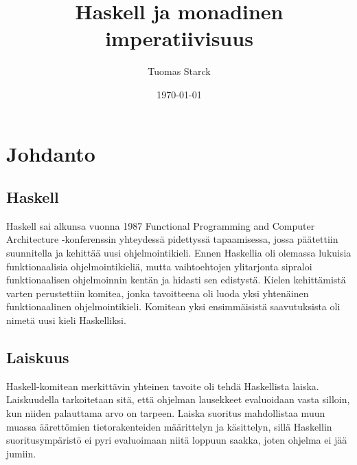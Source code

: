 \documentclass[finnish]{tktltiki2}
\title{Haskell ja monadinen imperatiivisuus}
\author{Tuomas Starck}
\date{\today}
\begin{document}
\frontmatter

\maketitle
\makeabstract

\tableofcontents

\mainmatter

\newcommand{\code}[1]{\texttt{#1}}
\newcommand{\fixme}[1]{\emph{#1}}


\section{Johdanto}



\subsection{Haskell}

Haskell sai alkunsa vuonna 1987 Functional Programming and Computer Architecture -konferenssin
yhteydessä pidettyssä tapaamisessa, jossa päätettiin suunnitella ja kehittää uusi ohjelmointikieli.
Ennen Haskellia oli olemassa lukuisia funktionaalisia ohjelmointikieliä, mutta vaihtoehtojen
ylitarjonta sipraloi funktionaalisen ohjelmoinnin kentän ja hidasti sen edistystä. Kielen
kehittämistä varten perustettiin komitea, jonka tavoitteena oli luoda yksi yhtenäinen
funktionaalinen ohjelmointikieli. Komitean yksi ensimmäisistä saavutuksista oli nimetä uusi kieli
Haskelliksi.~\cite{hoh07}

\subsection{Laiskuus}

Haskell-komitean merkittävin yhteinen tavoite oli tehdä Haskellista laiska. Laiskuudella
tarkoitetaan sitä, että ohjelman lausekkeet evaluoidaan vasta silloin, kun niiden palauttama arvo on
tarpeen. Laiska suoritus mahdollistaa muun muassa äärettömien tietorakenteiden määrittelyn ja
käsittelyn, sillä Haskellin suoritusympäristö ei pyri evaluoimaan niitä loppuun saakka, joten
ohjelma ei jää jumiin.
\end{document}
